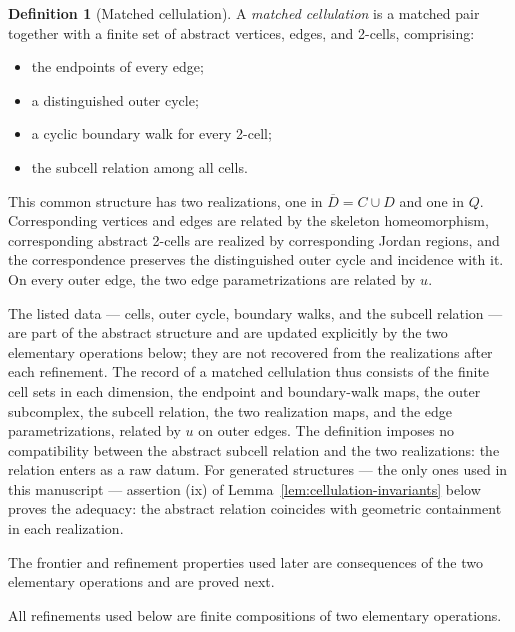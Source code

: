 \documentclass[11pt]{article}
\theoremstyle{mainplain}
\theoremstyle{mainroman}
\theoremstyle{definition}
\newtheorem{definition}[theorem]{Definition}
\providecommand{\tightlist}{\setlength{\itemsep}{0pt}\setlength{\parskip}{0pt}}
\numberwithin{equation}{section}
\begin{document}
\begin{definition}[Matched cellulation]\label{def:matched-cellulation}
A \emph{matched cellulation} is a matched pair together with a finite
set of abstract vertices, edges, and 2-cells, comprising:

\begin{itemize}
\tightlist
\item
  the endpoints of every edge;
\item
  a distinguished outer cycle;
\item
  a cyclic boundary walk for every 2-cell;
\item
  the subcell relation among all cells.
\end{itemize}

This common structure has two realizations, one in \(\overline D=C\cup D\) and one in \(Q\). Corresponding vertices and edges are related by the skeleton homeomorphism, corresponding abstract 2-cells are realized by corresponding Jordan regions, and the correspondence preserves the distinguished outer cycle and incidence with it. On every outer edge, the two edge parametrizations are related by \(u\).

The listed data --- cells, outer cycle, boundary walks, and the
subcell relation --- are part of the abstract structure and are
updated explicitly by the two elementary operations below; they are
not recovered from the realizations after each refinement. The record
of a matched cellulation thus consists of the finite cell sets in each
dimension, the endpoint and boundary-walk maps, the outer subcomplex,
the subcell relation, the two realization maps, and the edge
parametrizations, related by \(u\) on outer edges. The definition
imposes no compatibility between the abstract subcell relation and the
two realizations: the relation enters as a raw datum. For generated
structures --- the only ones used in this manuscript --- assertion
\textup{(ix)} of Lemma~\ref{lem:cellulation-invariants} below proves
the adequacy: the abstract relation coincides with geometric
containment in each realization.
\end{definition}

The frontier and refinement properties used later are consequences of the two elementary operations and are proved next.

All refinements used below are finite compositions of two elementary operations.
\end{document}
